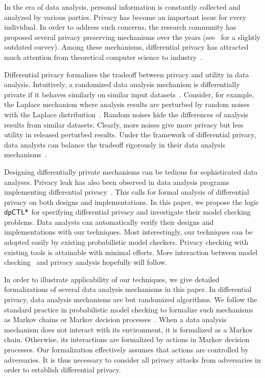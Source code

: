 

In the era of data analysis, personal information is constantly
collected and analyzed by various parties. Privacy has become an
important issue for every individual. In order to address such
concerns, the research community has proposed several privacy
preserving mechanisms over the years (see~\cite{FWC:10:PPDP} for a
slightly outdated survey). Among these mechanisms, differential
privacy has attracted much attention from theoretical computer science
to industry~\cite{DR:14:AFDP,JLE:14:DPML,A:16:EPYU}.

Differential privacy formalizes the tradeoff between privacy and
utility in data analysis. Intuitively, a randomized data analysis
mechanism is differentially private if it behaves similarly on similar
input datasets~\cite{DMNS:06:CNSPD,D:06:DP}. Consider, for example,
the Laplace mechanism where analysis results are perturbed by random
noises with the Laplace distribution~\cite{DR:14:AFDP}. Random noises
hide the differences of analysis results from similar datasets.
Clearly, more noises
give more privacy but less utility in released perturbed
results. Under the framework of differential privacy, data analysts
can balance the tradeoff rigorously in their data analysis
mechanisms~\cite{DR:14:AFDP,JLE:14:DPML}.


Designing differentially private mechanisms can be tedious for
sophisticated data analyses. Privacy leak has also been observed in
data analysis programs implementing differential
privacy~\cite{M:12:SLSBDP,TKBW:17:PLAI}. This calls for formal 
analysis of differential privacy on both designs and implementations.
In this paper, we propose the logic $\textsf{dpCTL*}$ for specifying
differential privacy and investigate their model checking
problems. Data analysts can automatically verify their designs and
implementations with our techniques. Most interestingly, our
techniques can be adopted easily by existing probabilistic
model checkers. Privacy checking with existing tools is attainable
with minimal efforts. More interaction
between model checking~\cite{ManneP92,BK:08:PMC} and privacy analysis hopefully will follow.


In order to illustrate applicability of our techniques, we give
detailed formalizations of several data analysis mechanisms in this
paper.
In differential privacy, data analysis mechanisms are
but randomized algorithms. We follow the standard practice in
probabilistic model checking to formalize such mechanisms
as Markov chains or Markov decision processes~\cite{Put05}. 
When a data analysis mechanism does not
interact with its environment, it is formalized as a Markov
chain. Otherwise, its interactions are formalized by actions in
Markov decision processes. Our formalization effectively assumes that
actions are controlled by adversaries. It is thus necessary to
consider all privacy attacks from adversaries in order to establish
differential privacy.

